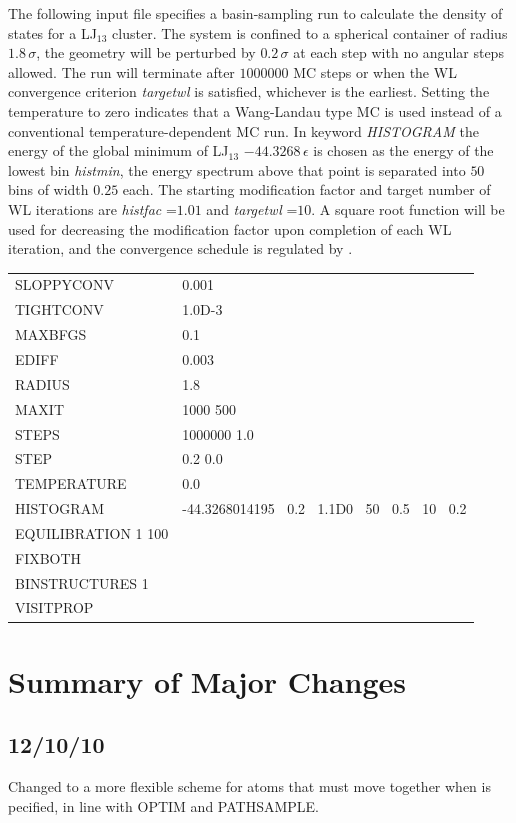 {\noindent The following input file specifies a basin-sampling run to calculate the density of states for 
a LJ$_{13}$ cluster. The system is
confined to a spherical container of radius $1.8\,\sigma$, 
the geometry will be perturbed by $0.2\,\sigma$ at each step with no
angular steps allowed. The run will terminate after $1000000$ 
MC steps or when the WL convergence criterion {\it targetwl}
is satisfied, whichever is the earliest. Setting the temperature to zero indicates that 
a Wang-Landau type MC is used instead of
a conventional temperature-dependent MC run. In keyword {\it HISTOGRAM\/}
the energy of the global minimum of LJ$_{13}$ $-44.3268\,\epsilon$ is chosen
as the energy of the lowest bin {\it histmin}, the energy spectrum above that point is 
separated into $50$ bins of width $0.25$ each. The
starting modification factor and target number of WL iterations are 
{\it histfac} =$ 1.01$ and {\it targetwl} =$ 10$. A square root function
will  be used for decreasing the modification factor upon completion of each WL iteration, 
and the convergence schedule is regulated by {}.  


\medskip
\begin{tabular}{ll}
SLOPPYCONV & 0.001 \\
TIGHTCONV & 1.0D-3 \\
MAXBFGS &  0.1 \\
EDIFF & 0.003 \\
RADIUS &  1.8 \\
MAXIT & 1000 500 \\
STEPS & 1000000 1.0 \\
STEP  & 0.2 0.0 \\
TEMPERATURE & 0.0 \\
HISTOGRAM & -44.3268014195 $\:$ 0.2 $\:$ 1.1D0 $\:$ 50 $\:$ 0.5 $\:$ 10 $\:$ 0.2 \\
EQUILIBRATION 1 100 \\
FIXBOTH \\
BINSTRUCTURES 1 \\
VISITPROP \\
\end{tabular}
\medskip

\section{Summary of Major Changes}

\subsection{12/10/10}
Changed to a more flexible scheme for atoms that must move together when
{\/} is pecified, in line with OPTIM and PATHSAMPLE.

}
